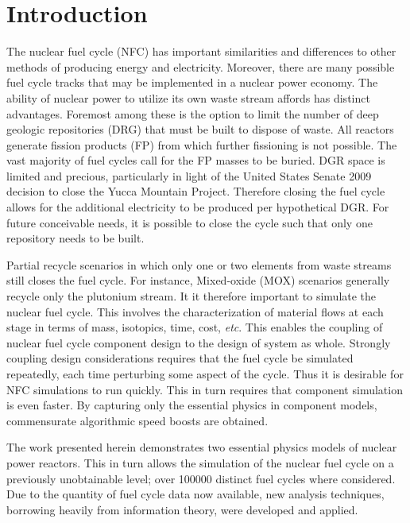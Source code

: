 \chapter{Introduction}
\label{diss_intro}
The nuclear fuel cycle (NFC) has important similarities and differences to other
methods of producing energy and electricity. 
Moreover, there are many possible fuel cycle tracks that may be implemented in a nuclear power economy.
The ability of nuclear power to utilize its own waste stream affords has distinct advantages.  
Foremost among these is the option to limit the number of deep geologic repositories (DRG) 
that must be built to dispose of waste.   All reactors generate fission products (FP) from 
which further fissioning is not possible.  The vast majority of fuel cycles call for the FP masses 
to be buried.  DGR space is limited and precious, particularly in light of the United States Senate 2009
decision to close the Yucca Mountain Project.  Therefore closing the fuel cycle allows for the 
additional electricity to be produced per hypothetical DGR.  For future conceivable needs, 
it is possible to close the cycle such that only one repository needs to be built.  

Partial recycle scenarios in which only one or two 
elements from waste streams still closes the fuel cycle.  For instance, Mixed-oxide (MOX) 
scenarios generally recycle only the plutonium stream.  
It it therefore important to simulate the nuclear fuel cycle.  This involves the characterization 
of material flows at each stage in terms of mass, isotopics, time, cost, \emph{etc}.  This enables 
the coupling of nuclear fuel cycle component design to the design of system as whole.  
Strongly coupling design considerations requires that the fuel cycle be simulated repeatedly, each 
time perturbing some aspect of the cycle.  Thus it is desirable for
NFC simulations to run quickly.  This in turn requires that component simulation is even faster. 
By capturing only the essential physics in component models, commensurate algorithmic speed 
boosts are obtained.

The work presented herein demonstrates two essential physics models of nuclear power reactors.
This in turn allows the simulation of the nuclear fuel cycle on a previously unobtainable level; over 
100000 distinct fuel cycles where considered.  Due to the quantity of fuel cycle data now 
available, new analysis techniques, borrowing heavily from information theory, were developed 
and applied.

